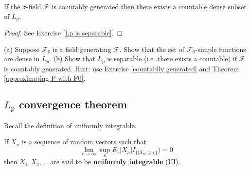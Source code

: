 \begin{theorem}[{\bf $L_p$ is separable}]
\label{Lp is separable theorem}
If the $\sigma$-field $\mathcal F$ is countably generated then there exists a countable dense subset of $L_p$.
\end{theorem}
\begin{proof}
See Exercise \ref{Lp is separable}.
\end{proof}

\begin{exercise}\label{Lp is separable}
 (a) Suppose $\mathcal F_0$ is a field generating $\mathcal F$. Show that the set of $\mathcal F_0$-simple functions are dense in $L_p$. (b) Show that $L_p$ is separable  (i.e. there exists a countable) if $\mathcal F$ is countably generated.
Hint: use Exercise \ref{countablly generated} and Theorem \ref{approximating P with F0}.
\end{exercise}



%
%
\subsection{$L_p$ convergence theorem}

Recall the definition of uniformly integrable.

\begin{definition}[{\bf UI}] If $X_n$ is a sequence of random vectors such that 
\[  \lim_{c\rightarrow \infty} \sup_n E\bigl(|X_n| I_{\{|X_n| \geq c\}} \bigr)=0\] 
then $X_1, X_2, \ldots$ are said to be {\bf uniformly integrable} (UI).
\end{definition}







